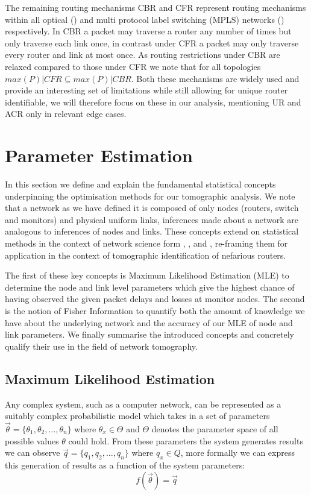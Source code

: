     The remaining routing mechanisms CBR and CFR represent routing mechanisms within all optical (\cite{ahuja_srlg_2011}) and multi protocol label switching (MPLS) networks (\cite{rosen_multiprotocol_2001}) respectively. In CBR a packet may traverse a router any number of times but only traverse each link once, in contrast under CFR a packet may only traverse every router and link at most once. As routing restrictions under CBR are relaxed compared to those under CFR we note that for all topologies $max(P)|CFR \subseteq max(P)|CBR$. Both these mechanisms are widely used and provide an interesting set of limitations while still allowing for unique router identifiable, we will therefore focus on these in our analysis, mentioning UR and ACR only in relevant edge cases.
    
\section{Parameter Estimation}
\label{sec:Bparameterestimation}

In this section we define and explain the fundamental statistical concepts underpinning the optimisation methods for our tomographic analysis. We note that a network as we have defined it is composed of only nodes (routers, switch and monitors) and physical uniform links, inferences made about a network are analogous to inferences of nodes and links. These concepts extend on statistical methods in the context of network science form \cite{meng_method_2016}, \cite{he_fisher_2015}, and \cite{he_network_2021}, re-framing them for application in the context of tomographic identification of nefarious routers.\par
The first of these key concepts is Maximum Likelihood Estimation (MLE) to determine the node and link level parameters which give the highest chance of having observed the given packet delays and losses at monitor nodes. The second is the notion of Fisher Information to quantify both the amount of knowledge we have about the underlying network and the accuracy of our MLE of node and link parameters. We finally summarise the introduced concepts and concretely qualify their use in the field of network tomography.

\subsection{Maximum Likelihood Estimation}
\label{ssec:Bmle}

Any complex system, such as a computer network, can be represented as a suitably complex probabilistic model which takes in a set of parameters $\vec{\theta} = \{\theta_1, \theta_2,\ldots,\theta_n\}$ where $\theta_x \in \Theta$ and $\Theta$ denotes the parameter space of all possible values $\theta$ could hold. From these parameters the system generates results we can observe $\vec{q} = \{q_1,q_2,\ldots,q_n\}$ where $q_x \in Q$, more formally we can express this generation of results as a function of the system parameters: \[f(\vec{\theta}) = \vec{q}\]

